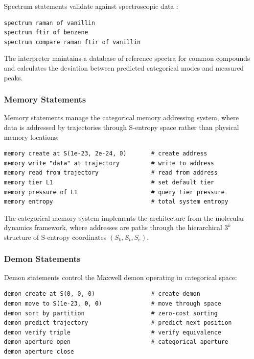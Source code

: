\documentclass[twocolumn,10pt]{article}
\begin{document}
Spectrum statements validate against spectroscopic data \cite{herzberg1945molecular,wilson1955molecular}:
\begin{lstlisting}
spectrum raman of vanillin
spectrum ftir of benzene
spectrum compare raman ftir of vanillin
\end{lstlisting}

The interpreter maintains a database of reference spectra for common compounds and calculates the deviation between predicted categorical modes and measured peaks.

\subsubsection{Memory Statements}

Memory statements manage the categorical memory addressing system, where data is addressed by trajectories through S-entropy space rather than physical memory locations:
\begin{lstlisting}
memory create at S(1e-23, 2e-24, 0)       # create address
memory write "data" at trajectory         # write to address
memory read from trajectory               # read from address
memory tier L1                            # set default tier
memory pressure of L1                     # query tier pressure
memory entropy                            # total system entropy
\end{lstlisting}

The categorical memory system implements the architecture from the molecular dynamics framework, where addresses are paths through the hierarchical $3^k$ structure of S-entropy coordinates $(S_k, S_t, S_e)$.

\subsubsection{Demon Statements}

Demon statements control the Maxwell demon operating in categorical space:
\begin{lstlisting}
demon create at S(0, 0, 0)                # create demon
demon move to S(1e-23, 0, 0)              # move through space
demon sort by partition                   # zero-cost sorting
demon predict trajectory                  # predict next position
demon verify triple                       # verify equivalence
demon aperture open                       # categorical aperture
demon aperture close
\end{lstlisting}
\end{document}

